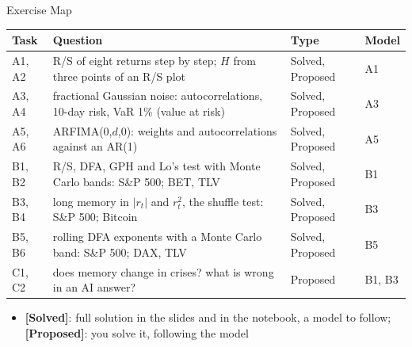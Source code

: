 \begin{frame}{Exercise Map}
\itemsize{\small}
\begin{center}
\footnotesize
\begin{tabular}{>{\raggedright\arraybackslash}p{1.1cm}>{\raggedright\arraybackslash}p{7.5cm}>{\raggedright\arraybackslash}p{1.9cm}>{\raggedright\arraybackslash}p{1.4cm}}
\toprule
\textbf{Task} & \textbf{Question} & \textbf{Type} & \textbf{Model} \\
\midrule
A1, A2 & R/S of eight returns step by step; $H$ from three points of an R/S plot & Solved, Proposed & A1 \\
A3, A4 & fractional Gaussian noise: autocorrelations, 10-day risk, VaR 1\% (value at risk) & Solved, Proposed & A3 \\
A5, A6 & ARFIMA(0,$d$,0): weights and autocorrelations against an AR(1) & Solved, Proposed & A5 \\
B1, B2 & R/S, DFA, GPH and Lo's test with Monte Carlo bands: S\&P 500; BET, TLV & Solved, Proposed & B1 \\
B3, B4 & long memory in $|r_t|$ and $r_t^2$, the shuffle test: S\&P 500; Bitcoin & Solved, Proposed & B3 \\
B5, B6 & rolling DFA exponents with a Monte Carlo band: S\&P 500; DAX, TLV & Solved, Proposed & B5 \\
C1, C2 & does memory change in crises? what is wrong in an AI answer? & Proposed & B1, B3 \\
\bottomrule
\end{tabular}
\end{center}
\begin{itemize}
    \item \textbf{[Solved]}: full solution in the slides and in the notebook, a model to follow; \textbf{[Proposed]}: you solve it, following the model
\end{itemize}
\end{frame}

